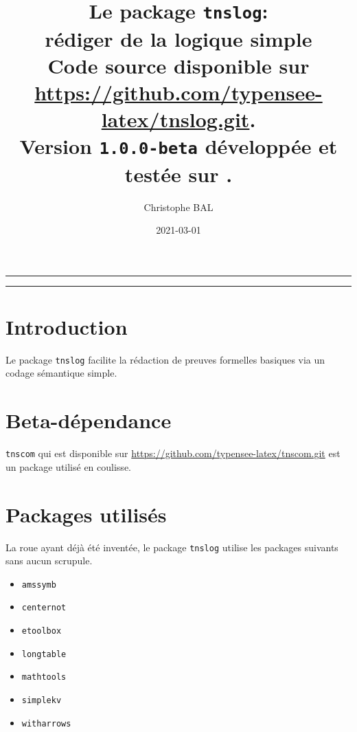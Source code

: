 \documentclass[12pt,a4paper]{article}
\theoremstyle{definition}
\begin{document}
\renewcommand\labelitemi{\raisebox{0.125em}{\tiny\textbullet}}
\renewcommand{\labelitemii}{---}

\title{  %
	Le package \texttt{tnslog}:\\%
	rédiger de la logique simple\\%
	{\footnotesize Code source disponible sur \url{https://github.com/typensee-latex/tnslog.git}.}\\%
{\footnotesize Version \texttt{1.0.0-beta} développée et testée sur \macosxname{}.}%
}
\author{Christophe BAL}
\date{2021-03-01}

\maketitle


\vspace{2em}

\hrule

\tableofcontents

\vspace{1.5em}

\hrule

\newpage

\section{Introduction}

Le package \verb+tnslog+ facilite la rédaction de preuves formelles basiques via un codage sémantique simple.


\section{Beta-dépendance}

\verb#tnscom# qui est disponible sur \url{https://github.com/typensee-latex/tnscom.git} est un package utilisé en coulisse.
\section{Packages utilisés}

La roue ayant déjà été inventée, le package \verb#tnslog# utilise les packages suivants sans aucun scrupule.

\begin{multicols}{4}
    \begin{itemize}
        \item \verb#amssymb#
        \item \verb#centernot#
        \item \verb#etoolbox#
        \item \verb#longtable#
        \item \verb#mathtools#
        \item \verb#simplekv#
        \item \verb#witharrows#
    \end{itemize}
\end{multicols}
\end{document}
